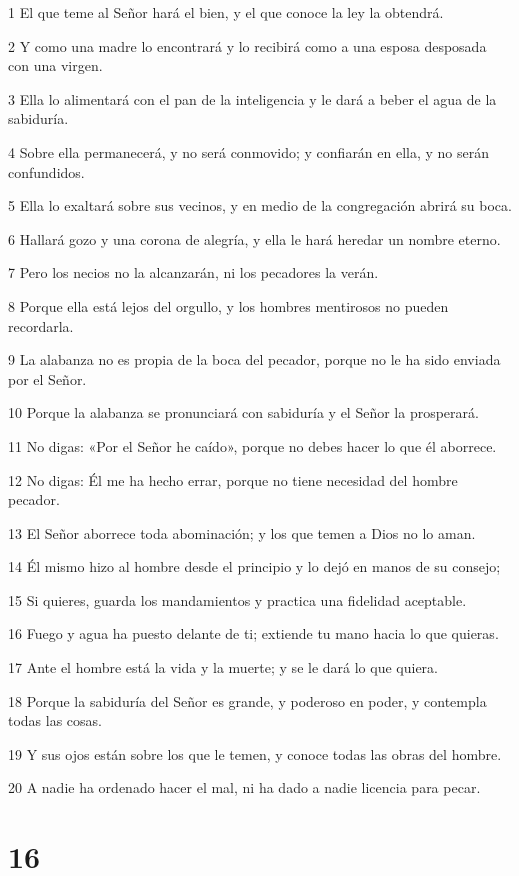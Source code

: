 \par 1 El que teme al Señor hará el bien, y el que conoce la ley la obtendrá.
\par 2 Y como una madre lo encontrará y lo recibirá como a una esposa desposada con una virgen.
\par 3 Ella lo alimentará con el pan de la inteligencia y le dará a beber el agua de la sabiduría.
\par 4 Sobre ella permanecerá, y no será conmovido; y confiarán en ella, y no serán confundidos.
\par 5 Ella lo exaltará sobre sus vecinos, y en medio de la congregación abrirá su boca.
\par 6 Hallará gozo y una corona de alegría, y ella le hará heredar un nombre eterno.
\par 7 Pero los necios no la alcanzarán, ni los pecadores la verán.
\par 8 Porque ella está lejos del orgullo, y los hombres mentirosos no pueden recordarla.
\par 9 La alabanza no es propia de la boca del pecador, porque no le ha sido enviada por el Señor.
\par 10 Porque la alabanza se pronunciará con sabiduría y el Señor la prosperará.
\par 11 No digas: «Por el Señor he caído», porque no debes hacer lo que él aborrece.
\par 12 No digas: Él me ha hecho errar, porque no tiene necesidad del hombre pecador.
\par 13 El Señor aborrece toda abominación; y los que temen a Dios no lo aman.
\par 14 Él mismo hizo al hombre desde el principio y lo dejó en manos de su consejo;
\par 15 Si quieres, guarda los mandamientos y practica una fidelidad aceptable.
\par 16 Fuego y agua ha puesto delante de ti; extiende tu mano hacia lo que quieras.
\par 17 Ante el hombre está la vida y la muerte; y se le dará lo que quiera.
\par 18 Porque la sabiduría del Señor es grande, y poderoso en poder, y contempla todas las cosas.
\par 19 Y sus ojos están sobre los que le temen, y conoce todas las obras del hombre.
\par 20 A nadie ha ordenado hacer el mal, ni ha dado a nadie licencia para pecar.

\chapter{16}

